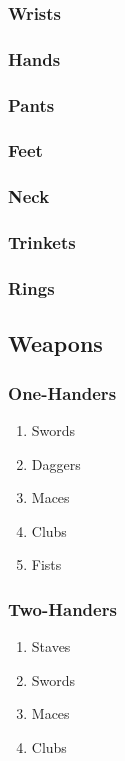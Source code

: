 \documentclass[10pt,oneside,x11names]{article}
\begin{document}
\subsubsection{Wrists}
\label{sec:orgheadline85}
\subsubsection{Hands}
\label{sec:orgheadline86}
\subsubsection{Pants}
\label{sec:orgheadline87}
\subsubsection{Feet}
\label{sec:orgheadline88}
\subsubsection{Neck}
\label{sec:orgheadline89}
\subsubsection{Trinkets}
\label{sec:orgheadline90}
\subsubsection{Rings}
\label{sec:orgheadline91}
\subsection{Weapons}
\label{sec:orgheadline108}
\subsubsection{One-Handers}
\label{sec:orgheadline98}
\begin{enumerate}
\item Swords
\label{sec:orgheadline93}
\item Daggers
\label{sec:orgheadline94}
\item Maces
\label{sec:orgheadline95}
\item Clubs
\label{sec:orgheadline96}
\item Fists
\label{sec:orgheadline97}
\end{enumerate}
\subsubsection{Two-Handers}
\label{sec:orgheadline103}
\begin{enumerate}
\item Staves
\label{sec:orgheadline99}
\item Swords
\label{sec:orgheadline100}
\item Maces
\label{sec:orgheadline101}
\item Clubs
\label{sec:orgheadline102}
\end{enumerate}
\end{document}
